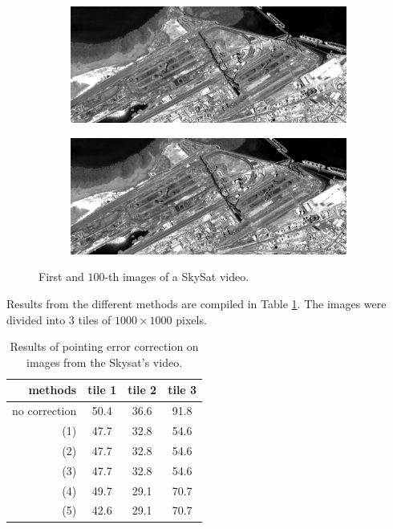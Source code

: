\documentclass[paper=a4, fontsize=11pt, onecolumn, tikz, dvipsnames, svgnames, x11names]{article}
\begin{document}
            \begin{figure}[H]
            \centering
            \begin{subfigure}[b]{0.8\linewidth}
              \centering\includegraphics[width=\textwidth]{figures/video_1.jpeg}
            \end{subfigure}%

            \begin{subfigure}[b]{0.8\linewidth}
              \centering\includegraphics[width=\textwidth]{figures/video_100.jpeg}
            \end{subfigure}
           \caption{First and $100$-th images of a SkySat video.}
           \label{fig:video}
          \end{figure}


Results from the different methods are compiled in Table \ref{tab:video-res}. The images were divided into $3$ tiles of $1000 \times 1000$ pixels.

\begin{table}[h]
\centering
             \begin{tabular}{|r||c|c|c|}
              \hline
            methods &     tile 1 & tile 2 & tile 3 \\
              \hline
          no correction &   50.4& 36.6& 91.8 \\
             \hline
      (1) & 47.7& 32.8& 54.6\\
     (2) & 47.7& 32.8& 54.6\\
      (3) & 47.7& 32.8& 54.6\\
      (4) & 49.7& 29.1& 70.7\\
      (5) & 42.6& 29.1& 70.7\\
              \hline
            \end{tabular}
                 \caption{Results of pointing error correction on images from the Skysat's video.}
             \label{tab:video-res}
          \end{table}
\end{document}
